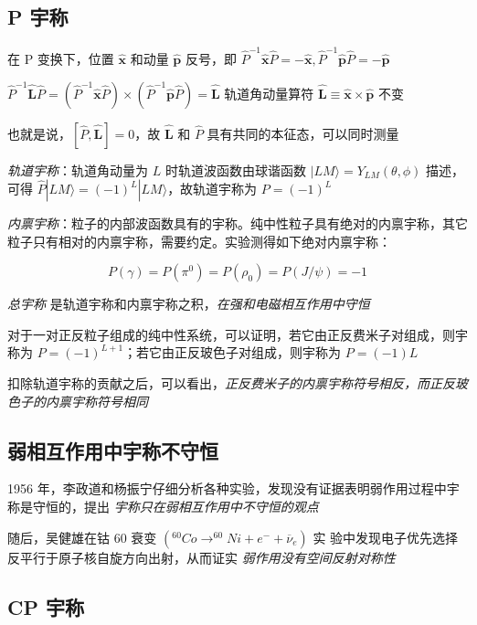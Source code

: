 \documentclass[oneside,a4paper,openany,11pt]{ctexbook}
\begin{document}
\subsection{P 宇称}

在 P 变换下，位置 $\hat{\mathbf{x}}$ 和动量 $\hat{\mathbf{p}}$ 反号，即 $\hat{P}^{-1} \hat{\mathbf{x}} \hat{P} = -\hat{\mathbf{x}}, \hat{P}^{-1} \hat{\mathbf{p}} \hat{P} = -\hat{\mathbf{p}}$

$\hat{P}^{-1} \hat{\mathbf{L}} \hat{P} = (\hat{P}^{-1} \hat{\mathbf{x}} \hat{P}) \times (\hat{P}^{-1} \hat{\mathbf{p}} \hat{P}) = \hat{\mathbf{L}}$ 轨道角动量算符 $\hat{\mathbf{L}} \equiv \hat{\mathbf{x}} \times \hat{\mathbf{p}}$ 不变

也就是说，$[\hat{P}, \hat{\mathbf{L}}] = 0$，故 $\hat{\mathbf{L}}$ 和 $\hat{P}$ 具有共同的本征态，可以同时测量

\emph{轨道宇称}：轨道角动量为 $L$ 时轨道波函数由球谐函数 $|LM\rangle = Y_{LM} (\theta, \phi)$ 描述，可得 $\hat{P} |LM\rangle = (-1)^L |LM\rangle$，故轨道宇称为 $P = (-1)^L$

\emph{内禀宇称}：粒子的内部波函数具有的宇称。纯中性粒子具有绝对的内禀宇称，其它粒子只有相对的内禀宇称，需要约定。实验测得如下绝对内禀宇称：

\begin{equation}
    P(\gamma) = P(\pi^0) = P(\rho_0) = P(J/\psi) = -1
\end{equation}

\emph{总宇称} 是轨道宇称和内禀宇称之积，\emph{在强和电磁相互作用中守恒}

对于一对正反粒子组成的纯中性系统，可以证明，若它由正反费米子对组成，则宇称为 $P = (-1)^{L+1}$；若它由正反玻色子对组成，则宇称为 $P = (-1)L$

扣除轨道宇称的贡献之后，可以看出，\emph{正反费米子的内禀宇称符号相反，而正反玻色子的内禀宇称符号相同}

\subsection{弱相互作用中宇称不守恒}

1956 年，李政道和杨振宁仔细分析各种实验，发现没有证据表明弱作用过程中宇称是守恒的，提出 \emph{宇称只在弱相互作用中不守恒的观点}

随后，吴健雄在钴 60 衰变 $(^{60}Co \to ^{60}Ni + e^- + \overline{\nu}_e)$ 实 验中发现电子优先选择反平行于原子核自旋方向出射，从而证实 \emph{弱作用没有空间反射对称性}

\subsection{CP 宇称}
\end{document}

